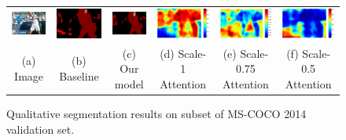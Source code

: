 \documentclass[10pt,twocolumn,letterpaper]{article}
\begin{document}
\begin{figure}
\begin{tabular}{c c c c c c}
   \includegraphics[height=0.09\linewidth]{fig/coco/img/COCO_val2014_000000002562.jpg} &
   \includegraphics[height=0.09\linewidth]{fig/coco/res_baseline/COCO_val2014_000000002562.png} &
   \includegraphics[height=0.09\linewidth]{fig/coco/res_sharenet/COCO_val2014_000000002562.png} &
   \includegraphics[height=0.09\linewidth]{fig/coco/att1/COCO_val2014_000000002562.pdf} &
   \includegraphics[height=0.09\linewidth]{fig/coco/att2/COCO_val2014_000000002562.pdf} &
   \includegraphics[height=0.09\linewidth]{fig/coco/att3/COCO_val2014_000000002562.pdf} \\
   {\scriptsize (a) Image} & 
   {\scriptsize (b) Baseline} & 
   {\scriptsize (c) Our model} & 
   {\scriptsize (d) Scale-1 Attention} & 
   {\scriptsize (e) Scale-0.75 Attention} &
   {\scriptsize (f) Scale-0.5 Attention} \\
  \end{tabular}
  \caption{Qualitative segmentation results on subset of MS-COCO 2014 validation set.}
  \label{fig:pascal_coco_results2}  
\end{figure}
\end{document}
